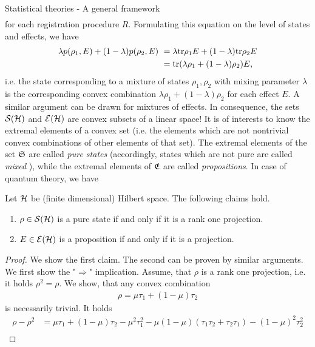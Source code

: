 \begin{section}{Statistical theories - A general framework}
\begin{align}
 \end{align} 
 for each registration procedure $R$. Formulating this equation on the level of states and effects, we have
 \begin{align}
    \lambda p(\rho_1, E) + (1-\lambda) p(\rho_2,E) \ 
    &= \lambda \tr \rho_1 E + (1-\lambda) \tr\rho_2 E \\
    &= \tr(\lambda \rho_1 + (1-\lambda)\rho_2)E,
 \end{align}  
 i.e. the state corresponding to a mixture of states $\rho_1, \rho_2$ with mixing parameter $\lambda$ is the corresponding convex combination $\lambda \rho_1 + (1-\lambda) \rho_2$ for each effect $E$. \newline 
 A similar argument can be drawn for mixtures of effects. In consequence, the sets ${\mathcal S}({\mathcal H})$ and ${\mathcal E}({\mathcal H})$ are convex subsets of a linear space!
  It is of interests to know the extremal elements of a convex set (i.e. the elements which are not nontrivial convex combinations of other elements of that set). The extremal elements of the set ${\mathfrak S}$ are called \emph{pure states} (accordingly, states which are not pure are called \emph{mixed} ), while the extremal elements of ${\mathfrak E}$ are called \emph{propositions}. In case of quantum theory, we have
 \begin{proposition}
  Let ${\mathcal H}$ be (finite dimensional) Hilbert space. The following claims hold. 
  \begin{enumerate}
   \item $\rho \in {\mathcal S}({\mathcal H})$ is a pure state if and only if it is a rank one projection.
   \item $E \in {\mathcal E}({\mathcal H})$ is a proposition if and only if it is a projection.
  \end{enumerate} 
 \end{proposition}
  \begin{proof}
  	We show the first claim. The second can be proven by similar arguments. We first show the "$\Rightarrow$" implication. Assume, that $\rho$ is a rank one projection, i.e. it holds
  	$ \rho^2 = \rho$. 
  	We show, that any convex combination 
  	\begin{align*}
  	\rho = \mu \tau_1 + (1-\mu) \tau_2 \label{thm:density_convexity_2}
  	\end{align*}
  	is necessarily trivial. It holds
  	\begin{align*}
  	\rho - \rho^2  
  	&= \mu \tau_1 + (1-\mu) \tau_2 - \mu^2 \tau_1^2 - \mu(1-\mu) (\tau_1 \tau_2 + \tau_2 \tau_1) - (1-\mu)^2 \tau_2^2 \\

\end{align*}
\end{proof}
\end{section}
